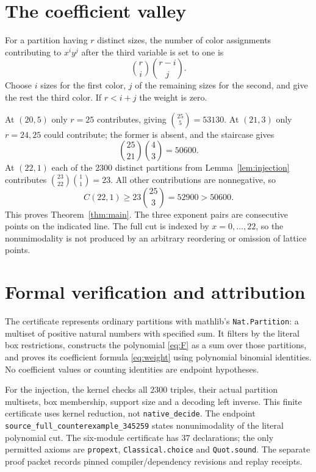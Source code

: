 \documentclass[11pt]{article}
\begin{document}
\section{The coefficient valley}
For a partition having $r$ distinct sizes, the number of color assignments
contributing to $x^iy^j$ after the third variable is set to one is
\begin{equation}\label{eq:weight}
 \binom ri\binom{r-i}{j}.
\end{equation}
Choose $i$ sizes for the first color, $j$ of the remaining sizes for the
second, and give the rest the third color. If $r<i+j$ the weight is zero.

At $(20,5)$ only $r=25$ contributes, giving $\binom{25}{5}=53130$.
At $(21,3)$ only $r=24,25$ could contribute; the former is absent, and
the staircase gives
\[
 \binom{25}{21}\binom43=50600.
\]
At $(22,1)$ each of the $2300$ distinct partitions from
Lemma~\ref{lem:injection} contributes
$\binom{23}{22}\binom11=23$. All other contributions are nonnegative, so
\[
 C(22,1)\ge23\binom{25}{3}=52900>50600.
\]
This proves Theorem~\ref{thm:main}. The three exponent pairs are
consecutive points on the indicated line. The full cut is indexed by
$x=0,\ldots,22$, so the nonunimodality is not produced by an arbitrary
reordering or omission of lattice points.

\section{Formal verification and attribution}
The certificate represents ordinary partitions with mathlib's
\texttt{Nat.Partition}: a multiset of positive natural numbers with
specified sum. It filters by the literal box restrictions, constructs
the polynomial \eqref{eq:F} as a sum over those partitions, and proves
its coefficient formula \eqref{eq:weight} using polynomial binomial
identities. No coefficient values or counting identities are endpoint
hypotheses.

For the injection, the kernel checks all $2300$ triples, their actual
partition multisets, box membership, support size and a decoding left
inverse. This finite certificate uses kernel reduction, not
\texttt{native\_decide}. The endpoint
\texttt{source\_full\_counterexample\_345259} states nonunimodality of
the literal polynomial cut. The six-module certificate has $37$
declarations; the only permitted axioms are \texttt{propext},
\texttt{Classical.choice} and \texttt{Quot.sound}. The separate proof
packet records pinned compiler/dependency revisions and replay receipts.
\end{document}
